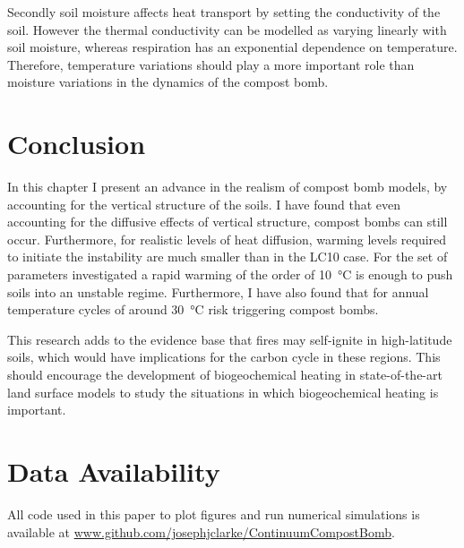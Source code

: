 Secondly soil moisture affects heat transport by setting the conductivity of the soil. However the thermal conductivity can be
modelled as varying linearly with soil moisture\cite{Best2011}, whereas respiration has an exponential dependence on temperature. Therefore, temperature variations
should play a more important role than moisture variations in the dynamics of the compost bomb.


\section{Conclusion}
\label{sec:conclusion}
In this chapter I present an advance in the realism of compost bomb models, by accounting for the vertical structure of the soils. I have found that even accounting
for the diffusive effects of vertical structure, compost bombs can still occur. Furthermore, for realistic levels of heat diffusion,
warming levels required to initiate the instability are much smaller than in the LC10 case. For the set of parameters investigated a rapid warming of the order of \SI{10}{\degreeCelsius} is
enough to push soils into an unstable regime. Furthermore, I have also found that for annual temperature cycles of around \SI{30}{\degreeCelsius} risk triggering compost bombs.

This research adds to the evidence base that fires may self-ignite in high-latitude soils, which would have implications for the carbon cycle in these regions.
This should encourage the development of biogeochemical heating in state-of-the-art land surface models to study the situations in which biogeochemical heating is important.

\section{Data Availability}
All code used in this paper to plot figures and run numerical simulations is available at \url{www.github.com/josephjclarke/ContinuumCompostBomb}.


